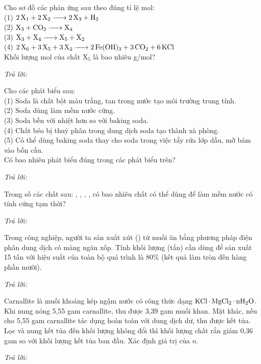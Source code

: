 \documentclass[11pt,a4paper]{article}
\def\loigiai#1{}
\begin{document}
\begin{ex}
Cho sơ đồ các phản ứng sau theo đúng tỉ lệ mol:\\
(1) $\ce{2X1 + 2X2 -> 2X3 + H2}$\\
(2) $\ce{X3 + CO2 -> X4}$\\
(3) $\ce{X3 + X4 -> X5 + X2}$\\
(4) $\ce{2X6 + 3X5 + 3X2 -> 2Fe(OH)3 + 3CO2 + 6KCl}$\\
Khối lượng mol của chất $\text{X}_5$ là bao nhiêu g/mol?
\par\noindent\textit{Trả lời:} \dotfill
\loigiai{}
\end{ex}

\begin{ex}
Cho các phát biểu sau:\\
(1) Soda là chất bột màu trắng, tan trong nước tạo môi trường trung tính.\\
(2) Soda dùng làm mềm nước cứng.\\
(3) Soda bền với nhiệt hơn so với baking soda.\\
(4) Chất béo bị thuỷ phân trong dung dịch soda tạo thành xà phòng.\\
(5) Có thể dùng baking soda thay cho soda trong việc tẩy rửa lớp dầu, mỡ bám vào bồn cầu.\\
Có bao nhiêu phát biểu đúng trong các phát biểu trên?
\par\noindent\textit{Trả lời:} \dotfill
\loigiai{}
\end{ex}

\begin{ex}
Trong số các chất sau: , , , , có bao nhiêu chất có thể dùng để làm mềm nước có tính cứng tạm thời?
\par\noindent\textit{Trả lời:} \dotfill
\loigiai{}
\end{ex}

\begin{ex}
Trong công nghiệp, người ta sản xuất xút () từ muối ăn bằng phương pháp điện phân dung dịch có màng ngăn xốp. Tính khối lượng (tấn)  cần dùng để sản xuất 15 tấn  với hiệu suất của toàn bộ quá trình là 80\% (kết quả làm tròn đến hàng phần mười).
\par\noindent\textit{Trả lời:} \dotfill
\loigiai{}
\end{ex}

\begin{ex}
Carnallite là muối khoáng kép ngậm nước có công thức dạng $\ce{KCl.MgCl2.nH2O}$. Khi nung nóng 5,55 gam carnallite, thu được 3,39 gam muối khan. Mặt khác, nếu cho 5,55 gam carnallite tác dụng hoàn toàn với dung dịch  dư, thu được kết tủa. Lọc và nung kết tủa đến khối lượng không đổi thì khối lượng chất rắn giảm 0,36 gam so với khối lượng kết tủa ban đầu. Xác định giá trị của $n$.
\par\noindent\textit{Trả lời:} \dotfill
\loigiai{}
\end{ex}

\end{document}
